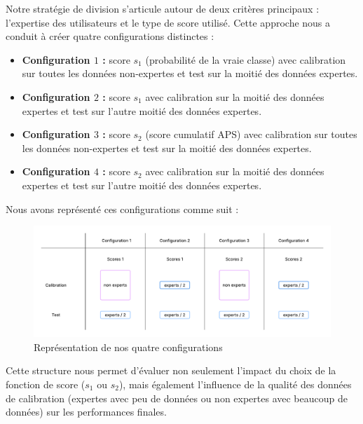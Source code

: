 \documentclass[a4paper,12pt]{article}
\begin{document}
Notre stratégie de division s'articule autour de deux critères principaux : l'expertise des utilisateurs et le type de score utilisé. Cette approche nous a conduit à créer quatre configurations distinctes : 
\begin{itemize}
    \item \textbf{Configuration $1$ :} score $s_1$ (probabilité de la vraie classe) avec calibration sur toutes les données non-expertes et test sur la moitié des données expertes.
    \item \textbf{Configuration $2$ :} score $s_1$ avec calibration sur la moitié des données expertes et test sur l'autre moitié des données expertes.
    \item \textbf{Configuration $3$ :} score $s_2$ (score cumulatif APS) avec calibration sur toutes les données non-expertes et test sur la moitié des données expertes.
    \item \textbf{Configuration $4$ :} score $s_2$ avec calibration sur la moitié des données expertes et test sur l'autre moitié des données expertes.
\end{itemize}

\vspace{0.2cm}

Nous avons représenté ces configurations comme suit : 
\begin{figure}[H]
    \centering
    \includegraphics[scale=0.6]{images/Models.png}
    \caption{Représentation de nos quatre configurations}
    \label{models}
  \end{figure}

\vspace{0.2cm}

Cette structure nous permet d'évaluer non seulement l'impact du choix de la fonction de score ($s_1$ ou $s_2$), mais également l'influence de la qualité des données de calibration (expertes avec peu de données ou non expertes avec beaucoup de données) sur les performances finales.

\vspace{0.2cm}
\end{document}

